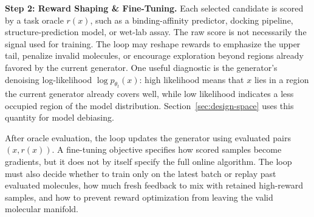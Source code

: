 \textbf{Step 2: Reward Shaping \& Fine-Tuning.}
Each selected candidate is scored by a task oracle $r(x)$, such as a binding-affinity predictor, docking pipeline, structure-prediction model, or wet-lab assay. The raw score is not necessarily the signal used for training. The loop may reshape rewards to emphasize the upper tail, penalize invalid molecules, or encourage exploration beyond regions already favored by the current generator. One useful diagnostic is the generator's denoising log-likelihood $\log p_{\theta_t}(x)$: high likelihood means that $x$ lies in a region the current generator already covers well, while low likelihood indicates a less occupied region of the model distribution. Section~\ref{sec:design-space} uses this quantity for model debiasing.

After oracle evaluation, the loop updates the generator using evaluated pairs $(x,r(x))$. A fine-tuning objective specifies how scored samples become gradients, but it does not by itself specify the full online algorithm. The loop must also decide whether to train only on the latest batch or replay past evaluated molecules, how much fresh feedback to mix with retained high-reward samples, and how to prevent reward optimization from leaving the valid molecular manifold.



